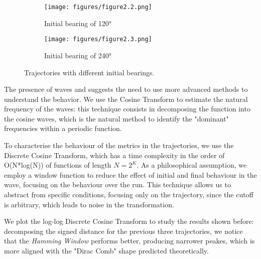 \documentclass[11pt]{article}
\begin{document}
            \begin{figure}[htbp]
              \centering
              \begin{subfigure}[b]{0.48\textwidth}
                \centering
                \texttt{[image: figures/figure2.2.png]}
                \caption{Initial bearing of 120°}
                \label{fig:bear120}
              \end{subfigure}
              \hfill
              \begin{subfigure}[b]{0.48\textwidth}
                \centering
                \texttt{[image: figures/figure2.3.png]}
                \caption{Initial bearing of 240°}
                \label{fig:bear240}
              \end{subfigure}
              \caption{Trajectories with different initial bearings.}
              \label{fig:trajectories}
            \end{figure}

            The presence of waves and suggests the need to use more advanced methods to understand the behavior. We use the Cosine Transform to estimate the natural frequency of the waves: this technique consists in decomposing the function into the cosine waves, which is the natural method to identify the "dominant" frequencies within a periodic function.

            To characterise the behaviour of the metrics in the trajectories, we use the Discrete Cosine Transform, which has a time complexity in the order of O(N*log(N)) of functions of length $N = 2^K$. As a philosophical assumption, we employ a window function to reduce the effect of initial and final behaviour in the wave, focusing on the behaviour over the run. This technique allows us to abstract from specific conditions, focusing only on the trajectory, since the cutoff is arbitrary, which leads to noise in the transformation.

            We plot the log-log Discrete Cosine Transform to study the results shown before: decomposing the signed distance for the previous three trajectories, we notice that the \textit{Hamming Window} performs better, producing narrower peakes, which is more aligned with the "Dirac Comb" shape predicted theoretically.
\end{document}
